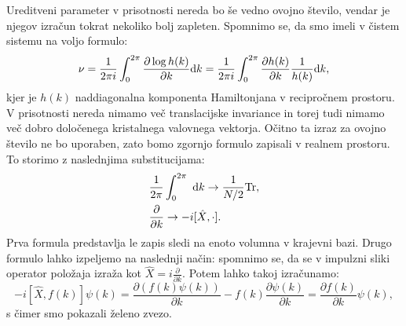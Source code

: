 Ureditveni parameter v prisotnosti nereda bo še vedno ovojno število, vendar je njegov izračun tokrat nekoliko bolj zapleten.
Spomnimo se, da smo imeli v čistem sistemu na voljo formulo:
\begin{equation}
\nu = \frac{1}{2 \pi i} \int_0^{2 \pi} \frac{\partial \log h(k)}{\partial k} \textup{d}k = \frac{1}{2 \pi i} \int_0^{2 \pi} \frac{\partial h(k)}{\partial k} \frac{1}{h(k)} \textup{d}k,
\end{equation}
kjer je $h(k)$ naddiagonalna komponenta Hamiltonjana v recipročnem prostoru. V prisotnosti nereda nimamo več translacijske invariance in torej tudi nimamo več dobro določenega kristalnega valovnega vektorja. Očitno ta izraz za ovojno število ne bo uporaben, zato bomo zgornjo formulo zapisali v realnem prostoru.
To storimo z naslednjima substitucijama:
\begin{align}
&\frac{1}{2 \pi} \int_0^{2 \pi}\  \textup{d}k \to \frac{1}{N/2} \mathrm{Tr}, \\
&\frac{\partial}{\partial k} \to  -i [\hat{X}, \cdot ]. 
\end{align}
Prva formula predstavlja le zapis sledi na enoto volumna v krajevni bazi. Drugo formulo lahko izpeljemo na naslednji način: 
spomnimo se, da se v impulzni sliki operator položaja izraža kot $\hat{X} = i \frac{\partial}{\partial k}$. Potem lahko takoj izračunamo:
\begin{equation}
 -i [\hat{X}, f(k)] \psi(k) =  \frac{\partial \left(f(k) \psi(k) \right)}{\partial k} - f(k) \frac{\partial \psi(k)}{\partial k} = \frac{\partial f(k)}{\partial k} \psi(k),
\end{equation}
s čimer smo pokazali želeno zvezo.


